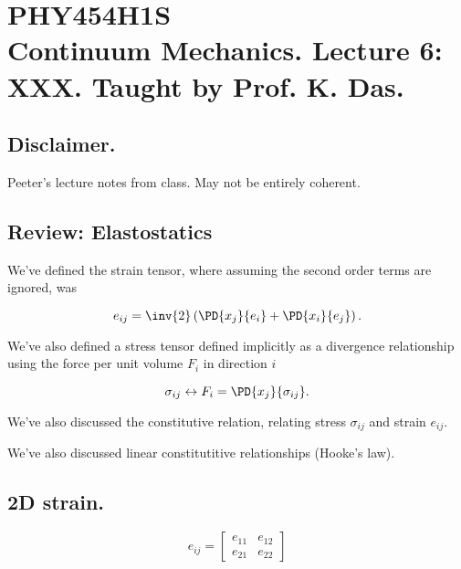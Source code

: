 
%

\chapter{PHY454H1S\\Continuum Mechanics.  Lecture 6: XXX.  Taught by Prof. K. Das.}
\label{chap:continuumL6}
{}
\date{Jan 27, 2012}

\beginArtWithToc

\section{Disclaimer.}

Peeter's lecture notes from class.  May not be entirely coherent.

\section{Review: Elastostatics}

We've defined the strain tensor, where assuming the second order terms are ignored, was

\begin{equation}\label{eqn:continuumL6:10}
e_{ij} = 
\inv{2} \left( 
\PD{x_j}{e_i}
+ \PD{x_i}{e_j} \right).
\end{equation}

We've also defined a stress tensor defined implicitly as a divergence relationship using the force per unit volume $F_i$ in direction $i$

\begin{equation}\label{eqn:continuumL6:30}
\sigma_{ij} \leftrightarrow F_i = \PD{x_j}{\sigma_{ij}}.
\end{equation}

We've also discussed the constitutive relation, relating stress $\sigma_{ij}$ and strain $e_{ij}$.

We've also discussed linear constitutitive relationships (Hooke's law).  

\section{2D strain.}

\begin{equation}\label{eqn:continuumL6:50}
e_{ij} = 
\begin{bmatrix}
e_{11} & e_{12} \\
e_{21} & e_{22}
\end{bmatrix}
\end{equation}

